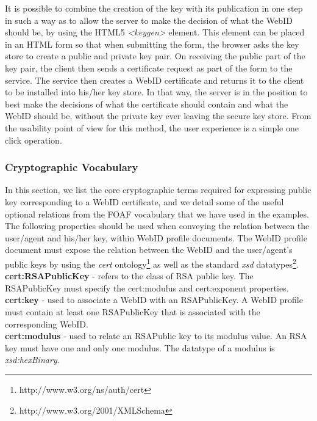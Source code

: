 It is possible to combine the creation of the key with its publication in one step in such a way as to allow the server to make the decision of what the WebID should be, by using the HTML5 \textit{<keygen>} element. This element can be placed in an HTML form so that when submitting the form, the browser asks the key store to create a public and private key pair. On receiving the public part of the key pair, the client then sends a certificate request as part of the form to the service. The service then creates a WebID certificate and returns it to the client to be installed into his/her key store. In that way, the server is in the position to best make the decisions of what the certificate should contain and what the WebID should be, without the private key ever leaving the secure key store. From the usability point of view for this method, the user experience is a simple one click operation.

\subsubsection{Cryptographic Vocabulary}
\label{subsubsec:crypto_vocab}
In this section, we list the core cryptographic terms required for expressing public key corresponding to a WebID certificate, and we detail some of the useful optional relations from the FOAF vocabulary that we have used in the examples.\\

The following properties should be used when conveying the relation between the user/agent and his/her key, within WebID profile documents. The WebID profile document must expose the relation between the WebID and the user/agent's public keys by using the \textit{cert} ontology\footnote{http://www.w3.org/ns/auth/cert} as well as the standard \textit{xsd} datatypes\footnote{http://www.w3.org/2001/XMLSchema}.\\

\textbf{cert:RSAPublicKey} - refers to the class of RSA public key. The RSAPublicKey must specify the cert:modulus and cert:exponent properties.\\

\textbf{cert:key} - used to associate a WebID with an RSAPublicKey. A WebID profile must contain at least one RSAPublicKey that is associated with the corresponding WebID.\\

\textbf{cert:modulus} - used to relate an RSAPublic key to its modulus value. An RSA key must have one and only one modulus. The datatype of a modulus is \textit{xsd:hexBinary}.\\


